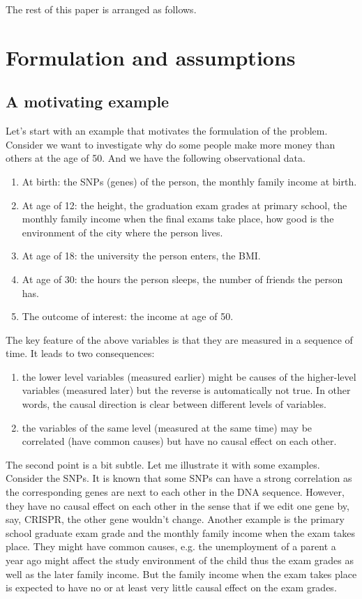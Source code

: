 \documentclass[11pt]{article}
\begin{document}
The rest of this paper is arranged as follows.

\section{Formulation and assumptions}%
\label{sec:formulation_and_assumptions}

\subsection{A motivating example}%
\label{sub:a_motivating_example}

Let's start with an example that motivates the formulation of the problem. Consider we want to investigate why do some people make more money than others at the age of 50. And we have the following observational data.
\begin{enumerate}
    \item At birth: the SNPs (genes) of the person, the monthly family income at birth.
    \item At age of 12: the height, the graduation exam grades at primary school, the monthly family income when the final exams take place, how good is the environment of the city where the person lives.
    \item At age of 18: the university the person enters, the BMI.
    \item At age of 30: the hours the person sleeps, the number of friends the person has.
    \item The outcome of interest: the income at age of 50.
\end{enumerate}

The key feature of the above variables is that they are measured in a sequence of time. It leads to two consequences:
\begin{enumerate}
    \item the lower level variables (measured earlier) might be causes of the higher-level variables (measured later) but the reverse is automatically not true. In other words, the causal direction is clear between different levels of variables.
    \item the variables of the same level (measured at the same time) may be correlated (have common causes) but have no causal effect on each other.
\end{enumerate}
The second point is a bit subtle. Let me illustrate it with some examples. Consider the SNPs. It is known that some SNPs can have a strong correlation as the corresponding genes are next to each other in the DNA sequence. However, they have no causal effect on each other in the sense that if we edit one gene by, say, CRISPR, the other gene wouldn't change. Another example is the primary school graduate exam grade and the monthly family income when the exam takes place. They might have common causes, e.g. the unemployment of a parent a year ago might affect the study environment of the child thus the exam grades as well as the later family income. But the family income when the exam takes place is expected to have no or at least very little causal effect on the exam grades.
\end{document}
